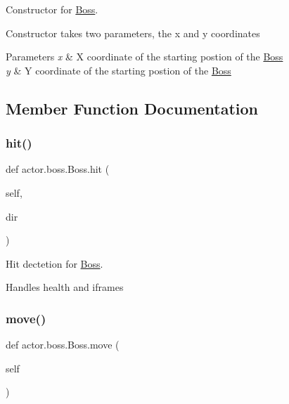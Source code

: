 Constructor for \hyperlink{classactor_1_1boss_1_1_boss}{Boss}. 

Constructor takes two parameters, the x and y coordinates 
\begin{DoxyParams}{Parameters}
{\em x} & X coordinate of the starting postion of the \hyperlink{classactor_1_1boss_1_1_boss}{Boss} \\
\hline
{\em y} & Y coordinate of the starting postion of the \hyperlink{classactor_1_1boss_1_1_boss}{Boss} \\
\hline
\end{DoxyParams}


\subsection{Member Function Documentation}
\mbox{\label{classactor_1_1boss_1_1_boss_a6909e66b1a94f284ff34d2498a807c48}} 
\subsubsection{\texorpdfstring{hit()}{hit()}}
{\footnotesize\ttfamily def actor.\+boss.\+Boss.\+hit (\begin{DoxyParamCaption}\item[{}]{self,  }\item[{}]{dir }\end{DoxyParamCaption})}



Hit dectetion for \hyperlink{classactor_1_1boss_1_1_boss}{Boss}. 

Handles health and iframes \mbox{\label{classactor_1_1boss_1_1_boss_aa4ec284ad22d7c18bfa7116e4b2863cf}} 
\subsubsection{\texorpdfstring{move()}{move()}}
{\footnotesize\ttfamily def actor.\+boss.\+Boss.\+move (\begin{DoxyParamCaption}\item[{}]{self }\end{DoxyParamCaption})}



